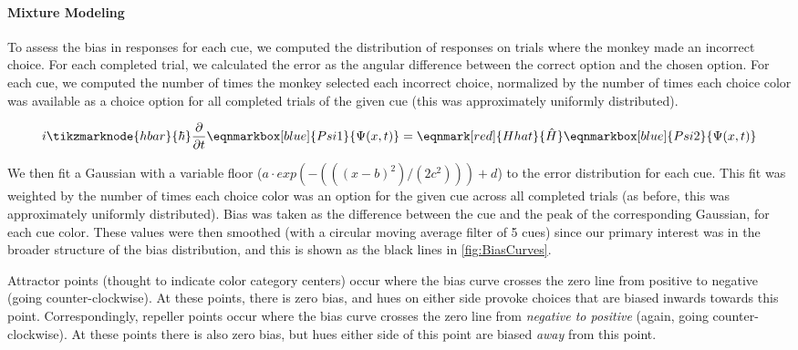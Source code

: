 \paragraph{Mixture Modeling}
 To assess the bias in responses for each cue, we computed the distribution of responses on trials where the monkey made an incorrect choice.
For each completed trial, we calculated the error as the angular difference between the correct option and the chosen option.  
For each cue, we computed the number of times the monkey selected each incorrect choice, normalized by the number of times each choice color was available as a choice option for all completed trials of the given cue (this was approximately uniformly distributed).


\vspace{4em} 
\renewcommand{\eqnhighlightheight}{\vphantom{\hat{H}}\mathstrut}
\begin{equation}
i \tikzmarknode{hbar}{\mathstrut\hbar} \frac{\partial}{\partial t}
\eqnmarkbox[blue]{Psi1}{\Psi(x, t)} = \eqnmark[red]{Hhat}{\hat{H}}
\eqnmarkbox[blue]{Psi2}{\Psi(x, t)}
\end{equation}
\vspace{1em}

We then fit a Gaussian with a variable floor ($a \cdot exp(-(((x-b)^2)/(2c^2)))+d$) to the error distribution for each cue. 
This fit was weighted by the number of times each choice color was an option for the given cue across all completed trials (as before, this was approximately uniformly distributed). 
Bias was taken as the difference between the cue and the peak of the corresponding Gaussian, for each cue color. These values were then smoothed (with a circular moving average filter of 5 cues) since our primary interest was in the broader structure of the bias distribution, and this is shown as the black lines in \autoref{fig:BiasCurves}.

Attractor points (thought to indicate color category centers) occur where the bias curve crosses the zero line from positive to negative (going counter-clockwise).
At these points, there is zero bias, and hues on either side provoke choices that are biased inwards towards this point.
Correspondingly, repeller points occur where the bias curve crosses the zero line from \emph{negative to positive} (again, going counter-clockwise).
At these points there is also zero bias, but hues either side of this point are biased \emph{away} from this point.

